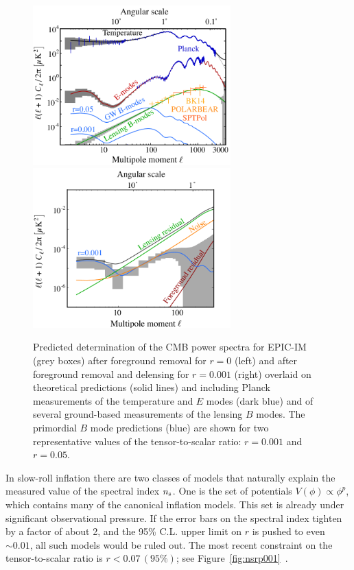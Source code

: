 \begin{figure}[ht!]
\begin{center}
\includegraphics[width=3in]{figs/cmb_powspec_v1.pdf}  
\includegraphics[width=3in]{figs/cmbbb_powspec_v1.pdf}
\end{center}
\vspace{-0.25in}
\caption{ \small \setlength{\baselineskip}{0.95\baselineskip}
Predicted determination of the \ac{CMB} power spectra for EPIC-IM (grey boxes) after foreground removal for $r=0$ (left) and after foreground removal and delensing for $r=0.001$ (right) overlaid on theoretical predictions (solid lines) and including Planck measurements of the temperature and $E$ modes (dark blue) and of several ground-based measurements of the lensing $B$ modes.  The primordial $B$ mode predictions (blue) are shown for two representative values of the tensor-to-scalar ratio: $r=0.001$ and $r=0.05.$ 
\label{fig:clall} }
\vspace{-0.05in}
\end{figure}


In slow-roll inflation there are two classes of models that naturally explain the measured value of the spectral index $n_{\rm s}$. 
One is the set of potentials $V(\phi)\propto\phi^p$, which contains many of the canonical inflation models. This 
set is already under significant observational pressure. If the error bars on the spectral index tighten by a factor of about 2, 
and the 95\% C.L. upper limit on $r$ is pushed to even $\sim0.01$, all such models would be ruled out. The most recent constraint on the tensor-to-scalar ratio is $r < 0.07 \, (95\%)$; see Figure~\ref{fig:nsrp001}~\cite{Array:2015xqh}. \\

